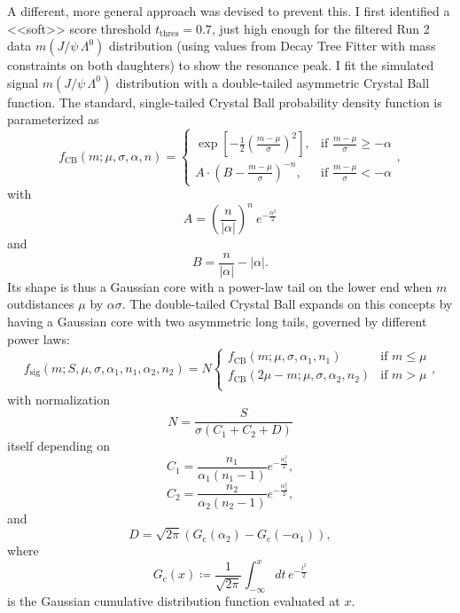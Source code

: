 A different, more general approach was devised to prevent this.
I first identified a <<soft>> score threshold $t_\text{thres} = 0.7$, just high enough for the filtered Run 2 data $m(J/\psi\,\Lambda^0)$ distribution (using values from Decay Tree Fitter with mass constraints on both \lbz daughters) to show the \lbz resonance peak.
I fit the simulated signal $m(J/\psi\,\Lambda^0)$ distribution with a double-tailed asymmetric Crystal Ball function.
The standard, single-tailed Crystal Ball probability density function is parameterized as
\begin{equation}
	f_\text{CB}(m; \mu, \sigma, \alpha, n) =
	\begin{cases}
		\exp\left[ -\frac{1}{2} {\left(\frac{m-\mu}{\sigma}\right)}^2 \right],
		& \text{if } \frac{m-\mu}{\sigma} \geq -\alpha \\
		A \cdot {\left(B - \frac{m-\mu}{\sigma}\right)}^{-n},
		& \text{if } \frac{m-\mu}{\sigma} < -\alpha
	\end{cases},
	\label{eq:4:crystal_ball}
\end{equation}
with
\begin{equation}
	A = {\left(\frac{n}{|\alpha|}\right)}^n~e^{-\frac{\alpha^2}{2}}
\end{equation}
and
\begin{equation}
	B = \frac{n}{|\alpha|} - |\alpha|.
\end{equation}
Its shape is thus a Gaussian core with a power-law tail on the lower end when $m$ outdistances $\mu$ by $\alpha\sigma$.
The double-tailed Crystal Ball expands on this concepts by having a Gaussian core with two asymmetric long tails, governed by different power laws:
\begin{equation}
	f_\text{sig}
	\left(m; S, \mu, \sigma, \alpha_1, n_1, \alpha_2, n_2 \right) =
	N
	\begin{cases}
	f_\text{CB}(m; \mu, \sigma, \alpha_1, n_1)
	& \text{if } m \leq \mu \\
	f_\text{CB}(2\mu -m; \mu, \sigma, \alpha_2, n_2)
	& \text{if } m > \mu \\
	\end{cases},
\end{equation}
with normalization
\begin{equation}
	N = \frac{S}{\sigma(C_1 + C_2 + D)}
\end{equation}
itself depending on
\begin{equation}
	C_1 = \frac{n_1}{\alpha_1 (n_1-1)} e^{-\frac{\alpha^2_1}{2}},
\end{equation}
\begin{equation}
	C_2 = \frac{n_2}{\alpha_2 (n_2-1)} e^{-\frac{\alpha^2_2}{2}},
\end{equation}
and
\begin{equation}
	D = \sqrt{2\pi} \left(G_\text{c} (\alpha_2) - G_\text{c} (- \alpha_1)\right),
\end{equation}
where
\begin{equation}
G_\text{c}(x) \coloneqq \frac{1}{\sqrt{2\pi}} \int_{-\infty}^x dt\,e^{-\frac{t^2}{2}}
\end{equation}
is the Gaussian cumulative distribution function evaluated at $x$.

